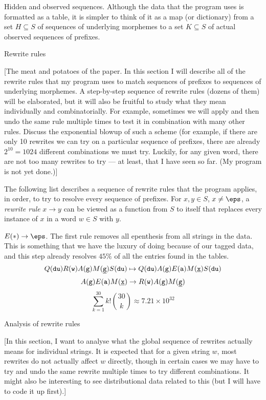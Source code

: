 \medskip\boldlabel Hidden and observed sequences.
Although the data that the program uses is formatted as a table, it is simpler to think of it as a map (or
dictionary) from a set $H\subseteq S$ of sequences of underlying morphemes to a set $K\subseteq S$
of actual observed sequences of prefixes.

\advsect Rewrite rules

[The meat and potatoes of the paper. In this section I will describe all of the rewrite rules that my program
uses to match sequences of prefixes to sequences of underlying morphemes. A step-by-step sequence of rewrite
rules (dozens of them) will be elaborated, but it will also be fruitful to study what they mean individually
and combinatorially. For example, sometimes we will apply and then undo the same rule multiple times to
test it in combination with many other rules. Discuss the exponential blowup of such a scheme (for example,
if there are only 10 rewrites we can try on a particular sequence of prefixes, there are already $2^{10} = 1024$
different combinations we must try. Luckily, for any given word, there are not too many rewrites to try --- at
least, that I have seen so far. (My program is not yet done.)]

The following list describes a sequence of rewrite rules that the program applies, in order, to try to resolve
every sequence of prefixes. For $x,y\in S$, $x\neq\eps$, a
{\it rewrite rule} $x\to y$ can be viewed as a function from $S$ to itself that
replaces every instance of $x$ in a word $w\in S$ with $y$.

\medskip\resetnum
\numitem $\E{*}\to \eps$.
\medskip
The first rule removes all epenthesis from all strings in the data. This is something that we have the luxury
of doing because of our tagged data, and this step already resolves $45\%$ of all the entries found in the tables.
$$Q({\tt du})R({\tt w})A({\tt g})M({\tt \underline{g}})S({\tt du})\mapsto Q({\tt du})A({\tt g})E({\tt a})M({\tt \underline{x}})S({\tt du})$$
$$A({\tt g})E({\tt a})M({\tt \underline{x}}) \to R({\tt w})A({\tt g})M({\tt \underline{g}})$$
$$\sum_{k=1}^{30} k!{30\choose k} \approx 7.21\times 10^{32}$$

\advsect Analysis of rewrite rules

[In this section, I want to analyse what the global sequence of rewrites actually means for individual strings.
It is expected that for a given string $w$, most rewrites do not actually affect $w$ directly, though
in certain cases we may have to try and undo the same rewrite multiple times to try different combinations.
It might also be interesting to see distributional data related to this (but I will have to code it up first).]

